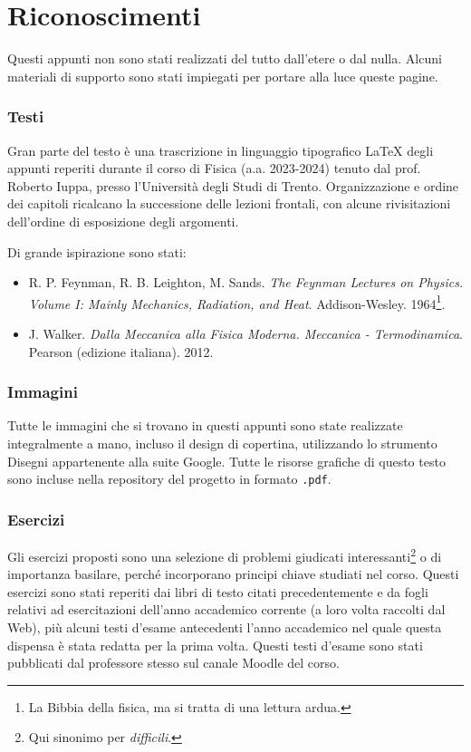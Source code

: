 \section*{Riconoscimenti}
Questi appunti non sono stati realizzati del tutto dall'etere o dal nulla.
Alcuni materiali di supporto sono stati impiegati per portare alla luce
queste pagine.

\subsubsection*{Testi}
Gran parte del testo è una trascrizione in linguaggio tipografico \LaTeX\@
degli appunti reperiti durante
il corso di Fisica (a.a. 2023-2024) tenuto dal prof. Roberto Iuppa, presso
l'Università degli Studi di Trento. Organizzazione e ordine dei
capitoli ricalcano la successione delle lezioni frontali, con alcune
rivisitazioni dell'ordine di esposizione degli argomenti.

Di grande ispirazione sono stati:
\begin{itemize}
    \item R. P. Feynman, R. B. Leighton, M. Sands. \textit{The Feynman Lectures on Physics. Volume I: Mainly Mechanics, Radiation, and Heat}. Addison-Wesley. 1964\footnote{La Bibbia della fisica, ma si tratta di una lettura ardua.}.
    \item J. Walker. \textit{Dalla Meccanica alla Fisica Moderna. Meccanica - Termodinamica}. Pearson (edizione italiana). 2012.
\end{itemize}

\subsubsection*{Immagini}
Tutte le immagini che si trovano in questi appunti sono state realizzate
integralmente a mano, incluso il design di copertina, utilizzando
lo strumento Disegni appartenente alla suite Google. Tutte le risorse
grafiche di questo testo sono incluse nella repository del progetto in
formato \texttt{.pdf}.

\subsubsection*{Esercizi}
Gli esercizi proposti sono una selezione di problemi
giudicati interessanti\footnote{Qui sinonimo per \textit{difficili}.} o
di importanza basilare, perché incorporano principi chiave studiati nel corso.
Questi esercizi sono stati reperiti dai libri di testo citati precedentemente
e da fogli relativi ad esercitazioni dell'anno accademico corrente (a loro
volta raccolti dal Web), più alcuni testi d'esame antecedenti l'anno accademico
nel quale questa dispensa è stata redatta per la prima volta. Questi testi
d'esame sono stati pubblicati dal professore stesso sul canale Moodle del corso.